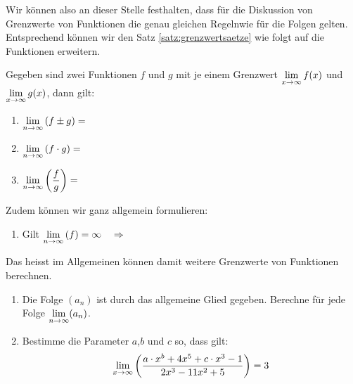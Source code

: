 \documentclass[11pt,oneside]{article}
\begin{document}
	Wir können also an dieser Stelle festhalten, dass für die Diskussion von Grenzwerte von Funktionen die genau gleichen \flqq Regeln\frqq\:wie für die Folgen gelten. Entsprechend können wir den Satz \ref{satz:grenzwertsaetze} wie folgt auf die Funktionen erweitern.
	\begin{satz}[Grenzwertsätze]
		Gegeben sind zwei Funktionen $f$ und $g$ mit je einem Grenzwert $\displaystyle\lim_{x\rightarrow\infty}f(x)$ und $\displaystyle\lim_{x\rightarrow\infty}g(x)$, dann gilt:
		\begin{enumerate}[label=\ ,leftmargin=2cm]
			\item $\displaystyle\lim_{n\rightarrow\infty}\left(f\pm g\right)=$
			\item $\displaystyle\lim_{n\rightarrow\infty}\left(f\cdot g\right)=$
			\item $\displaystyle\lim_{n\rightarrow\infty}\left(\frac{f}{g}\right)=$
		\end{enumerate}
		Zudem können wir ganz allgemein formulieren:
		\begin{enumerate}[label=\ ,leftmargin=2cm]
			\item Gilt $\displaystyle\lim_{n\rightarrow\infty}\left(f\right)=\infty\quad\Rightarrow$
		\end{enumerate}
	\end{satz}
	Das heisst im Allgemeinen können damit weitere Grenzwerte von Funktionen berechnen.
	\begin{aufgabe}
		\begin{enumerate}
			\item Die Folge $(a_n)$ ist durch das allgemeine Glied gegeben. Berechne für jede Folge $\displaystyle\lim_{n\rightarrow\infty}(a_n)$.
			\item Bestimme die Parameter $a$,$b$ und $c$ so, dass gilt: \[\lim_{x\rightarrow\infty}\left(\frac{a\cdot x^b+4x^5+c\cdot x^3-1}{2x^3-11x^2+5}\right)=3\]
		\end{enumerate}
	\end{aufgabe}
\end{document}
